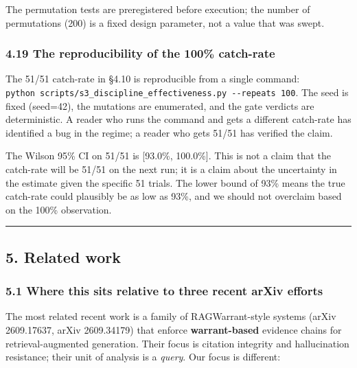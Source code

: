 \documentclass[
]{article}
\begin{document}
The permutation tests are preregistered before execution; the number of
permutations (200) is a fixed design parameter, not a value that was
swept.

\subsubsection{4.19 The reproducibility of the 100\%
catch-rate}\label{the-reproducibility-of-the-100-catch-rate}

The 51/51 catch-rate in §4.10 is reproducible from a single command:
\texttt{python\ scripts/s3\_discipline\_effectiveness.py\ -\/-repeats\ 100}.
The seed is fixed (seed=42), the mutations are enumerated, and the gate
verdicts are deterministic. A reader who runs the command and gets a
different catch-rate has identified a bug in the regime; a reader who
gets 51/51 has verified the claim.

The Wilson 95\% CI on 51/51 is {[}93.0\%, 100.0\%{]}. This is not a
claim that the catch-rate will be 51/51 on the next run; it is a claim
about the uncertainty in the estimate given the specific 51 trials. The
lower bound of 93\% means the true catch-rate could plausibly be as low
as 93\%, and we should not overclaim based on the 100\% observation.

\begin{center}\rule{0.5\linewidth}{0.5pt}\end{center}

\subsection{5. Related work}\label{related-work}

\subsubsection{5.1 Where this sits relative to three recent arXiv
efforts}\label{where-this-sits-relative-to-three-recent-arxiv-efforts}

The most related recent work is a family of RAGWarrant-style systems
(arXiv 2609.17637, arXiv 2609.34179) that enforce \textbf{warrant-based}
evidence chains for retrieval-augmented generation. Their focus is
citation integrity and hallucination resistance; their unit of analysis
is a \emph{query}. Our focus is different:
\end{document}
